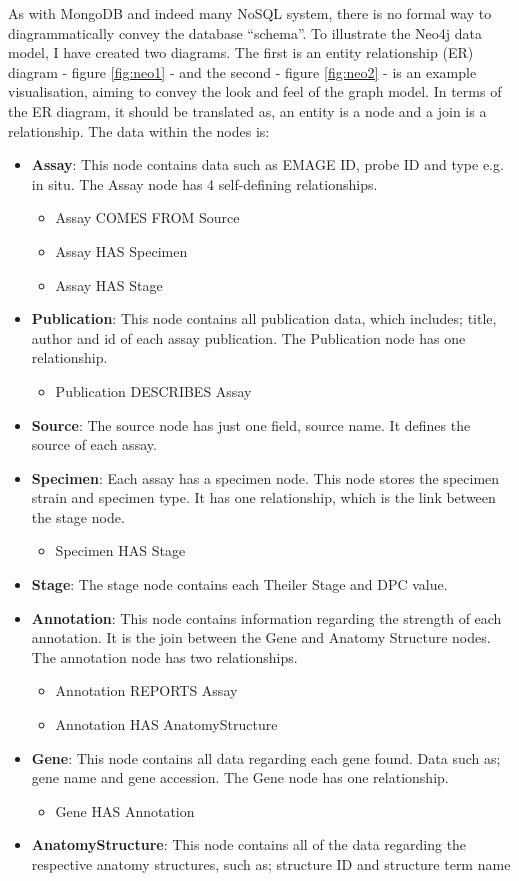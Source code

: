 As with MongoDB and indeed many NoSQL system, there is no formal way to diagrammatically convey the database ``schema''. To illustrate the Neo4j data model, I have created two diagrams. The first is an entity relationship (ER) diagram - figure \ref{fig:neo1} - and the second - figure \ref{fig:neo2} - is an example visualisation, aiming to convey the look and feel of the graph model. In terms of the ER diagram, it should be translated as, an entity is a node and a join is a relationship. The data within the nodes is:

\begin{itemize}
\item \textbf{Assay}: This node contains data such as EMAGE ID, probe ID and type e.g. in situ. The Assay node has 4 self-defining relationships.
\begin{itemize}
\item Assay COMES FROM Source
\item Assay HAS Specimen
\item Assay HAS Stage
\end{itemize}
\item \textbf{Publication}: This node contains all publication data, which includes; title, author and id of each assay publication. The Publication node has one relationship.
\begin{itemize}
\item Publication DESCRIBES Assay
\end{itemize}
\item \textbf{Source}: The source node has just one field, source name. It defines the source of each assay.
\item \textbf{Specimen}: Each assay has a specimen node. This node stores the specimen strain and specimen type. It has one relationship, which is the link between the stage node.
\begin{itemize}
\item Specimen HAS Stage
\end{itemize}
\item \textbf{Stage}: The stage node contains each Theiler Stage and DPC value.
\item \textbf{Annotation}: This node contains information regarding the strength of each annotation. It is the join between the Gene and Anatomy Structure nodes. The annotation node has two relationships.
\begin{itemize}
\item Annotation REPORTS Assay
\item Annotation HAS AnatomyStructure
\end{itemize}
\item \textbf{Gene}: This node contains all data regarding each gene found. Data such as; gene name and gene accession. The Gene node has one relationship.
\begin{itemize}
\item Gene HAS Annotation
\end{itemize}
\item \textbf{AnatomyStructure}: This node contains all of the data regarding the respective anatomy structures, such as; structure ID and structure term name
\end{itemize}

